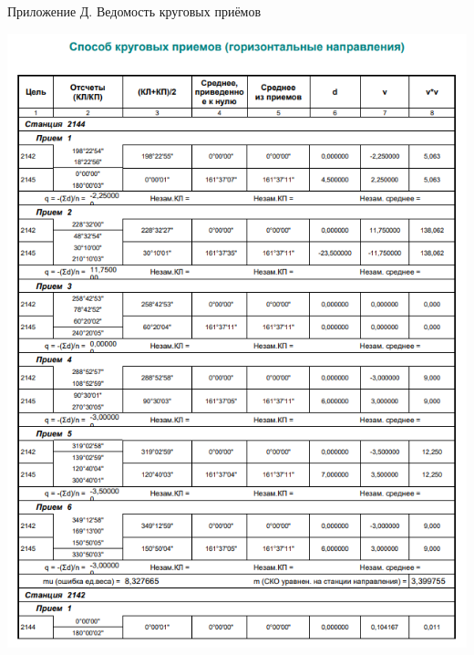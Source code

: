 \documentclass[a4paper]{article}
\begin{document}
\begin{newpage}

    \begin{flushright}
        Приложение Д. Ведомость круговых приёмов
    \end{flushright}
    
    \begin{center}
        \includegraphics[scale=1.36]{vedomosty/скп1.png}

\end{center}
\end{newpage}
\end{document}
